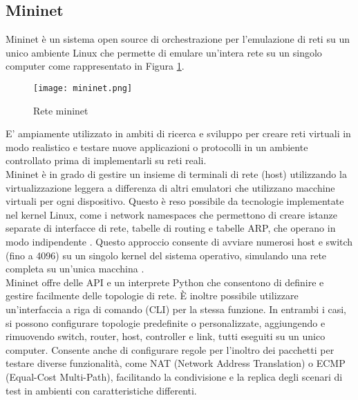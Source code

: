 \subsection{Mininet}
\label{ch:Mininet}
Mininet \cite{mininet} è un sistema open source di orchestrazione per l'emulazione di reti su un unico ambiente Linux che permette di emulare un'intera rete su un singolo computer come rappresentato in Figura \ref{fig:mininet}.
\begin{figure}[h]
    \centering
   \texttt{[image: mininet.png]}
    \caption{Rete mininet}
    \label{fig:mininet}
\end{figure}
E' ampiamente utilizzato in ambiti di ricerca e sviluppo per creare reti virtuali in modo realistico e testare nuove applicazioni o protocolli in un ambiente controllato prima di implementarli su reti reali.
\\Mininet è in grado di gestire un insieme di terminali di rete (host)
utilizzando la virtualizzazione leggera a differenza di altri emulatori che utilizzano macchine virtuali per ogni dispositivo.
Questo è reso possibile da tecnologie implementate nel kernel Linux, come i network namespaces
che permettono di creare istanze separate di interfacce di rete, tabelle di routing e tabelle ARP, che operano in modo indipendente \cite{tesiMininet}. 
Questo approccio consente di avviare numerosi host e switch (fino a 4096) su un singolo kernel del sistema operativo, simulando una rete completa su un'unica macchina \cite{MininetOv}.
\\Mininet offre delle API e un interprete Python che consentono di definire e gestire facilmente delle topologie di rete.
È inoltre possibile utilizzare un'interfaccia a riga di comando (CLI) per la stessa funzione.
In entrambi i casi, si possono configurare topologie predefinite o personalizzate, aggiungendo e rimuovendo switch, router, host, controller e link, tutti eseguiti su un unico computer.
Consente anche di configurare regole per l'inoltro dei pacchetti per testare diverse funzionalità, come NAT (Network Address Translation) o ECMP (Equal-Cost Multi-Path), facilitando la condivisione e la replica degli scenari di test in ambienti con caratteristiche differenti.
